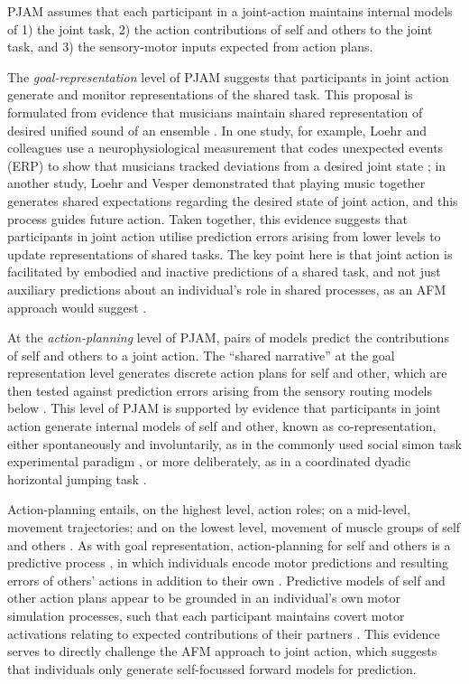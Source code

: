 \begin{CJK}{UTF8}{gbsn}
PJAM assumes that each participant in a joint-action maintains internal models of 1) the joint task, 2) the action contributions of self and others to the joint task, and  3) the sensory-motor inputs expected from action plans.

The \textit{goal-representation} level of PJAM suggests that participants in joint action generate and monitor representations of the shared task. This proposal is formulated from evidence that musicians maintain shared representation of desired unified sound of an ensemble \citep{Keller2008}.  In one study, for example, Loehr and colleagues  use a neurophysiological measurement that codes unexpected events (ERP) to show that musicians tracked deviations from a desired joint state \citep{Loehr2013}; in another study, Loehr and Vesper \textcite{Loehr2016} demonstrated that playing music together generates shared expectations regarding the desired state of joint action, and this process guides future action.  Taken together, this evidence suggests that participants in joint action utilise prediction errors arising from lower levels to update representations of shared tasks.  The key point here is that joint action is facilitated by embodied and inactive predictions of a shared task, and not just auxiliary predictions about an individual's role in shared processes, as an AFM approach would suggest \citep{Keller2016}.


At the \textit{action-planning} level of PJAM, pairs of models predict the contributions of self and others to a joint action.  The ``shared narrative'' at the goal representation level generates discrete action plans for self and other, which are then tested against prediction errors arising from the sensory routing models below \citep{Pesquita2017}.  This level of PJAM is supported by evidence that participants in joint action generate internal models of self and other, known as co-representation, either spontaneously and involuntarily, as in the commonly used social simon task experimental paradigm \citep{Sebanz2003,Atmaca2008}, or more deliberately, as in a coordinated dyadic horizontal jumping task \citep{Vesper2012}.

Action-planning entails, on the highest level, action roles; on a mid-level, movement trajectories; and on the lowest level, movement of muscle groups of self and others \citep{Pesquita2017}.  As with goal representation, action-planning for self and others is a predictive process \citep{Flanagan2003}, in which individuals encode motor predictions and resulting errors of others' actions in addition to their own \citep{VanSchie2004,Radke2011}.  Predictive models of self and other action plans appear to be grounded in an individual's own motor simulation processes, such that each participant maintains covert motor activations relating to expected contributions of their partners \citep{Hollander2012}.  This evidence serves to directly challenge the AFM approach to joint action, which suggests that individuals only generate self-focussed forward models for prediction.


\end{CJK}

